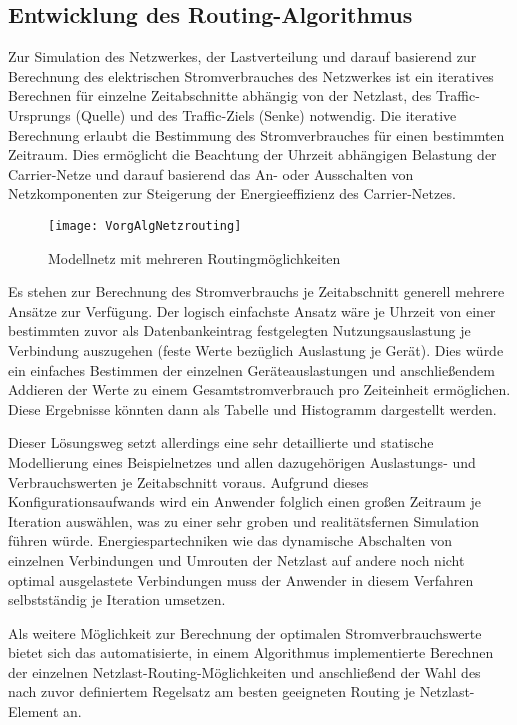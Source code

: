 \subsection{Entwicklung des Routing-Algorithmus}\label{subsec:VorgAlg}
Zur Simulation des Netzwerkes, der Lastverteilung und darauf basierend zur Berechnung des elektrischen Stromverbrauches des Netzwerkes ist ein iteratives Berechnen für einzelne Zeitabschnitte abhängig von der Netzlast, des Traffic-Ursprungs (Quelle) und des Traffic-Ziels (Senke) notwendig.
Die iterative Berechnung erlaubt die Bestimmung des Stromverbrauches für einen bestimmten Zeitraum. Dies ermöglicht die Beachtung der Uhrzeit abhängigen Belastung der Carrier-Netze und darauf basierend das An- oder Ausschalten von Netzkomponenten zur Steigerung der Energieeffizienz des Carrier-Netzes.  


\begin{figure}[!ht]
	\centering
	\texttt{[image: VorgAlgNetzrouting]}
	\caption{Modellnetz mit mehreren Routingmöglichkeiten}
	\label{fig:VorgAlgNetzrouting}
\end{figure}


Es stehen zur Berechnung des Stromverbrauchs je Zeitabschnitt generell mehrere Ansätze zur Verfügung. Der logisch einfachste Ansatz wäre je Uhrzeit von einer bestimmten zuvor als Datenbankeintrag festgelegten Nutzungsauslastung je Verbindung auszugehen (feste Werte bezüglich Auslastung je Gerät). Dies würde ein einfaches Bestimmen der einzelnen Geräte\-aus\-las\-tungen und anschließendem Addieren der Werte zu einem Gesamtstromverbrauch pro Zeiteinheit ermöglichen. Diese Ergebnisse könnten dann als Tabelle und Histogramm dargestellt werden.


Dieser Lösungsweg setzt allerdings eine sehr detaillierte und statische Modellierung eines Beispielnetzes und allen dazugehörigen Auslastungs- und Verbrauchswerten je Zeitabschnitt voraus. Aufgrund dieses Konfigurationsaufwands wird ein Anwender folglich einen großen Zeitraum je Iteration auswählen, was zu einer sehr groben und realitätsfernen Simulation führen würde. Energiespartechniken wie das dynamische Abschalten von einzelnen Verbindungen und Umrouten der Netzlast auf andere noch nicht optimal ausgelastete Verbindungen muss der Anwender in diesem Verfahren selbstständig je Iteration umsetzen.


Als weitere Möglichkeit zur Berechnung der optimalen Stromverbrauchswerte bietet sich das automatisierte, in einem Algorithmus implementierte Berechnen der einzelnen Netzlast-Routing-Möglichkeiten und anschließend der Wahl des nach zuvor definiertem Regelsatz am besten geeigneten Routing je Netzlast-Element an.

